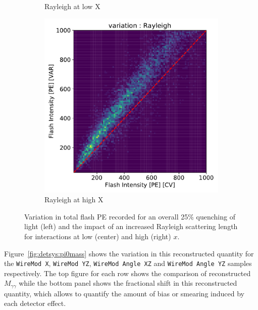 \documentclass[a4paper]{article}
\begin{document}
\begin{figure}[H]
\begin{center}
\begin{subfigure}[b]{0.3\textwidth}
    \caption{\label{fig:detsys:flashpe:RYlow}Rayleigh at low X}
    \end{subfigure}
    \begin{subfigure}[b]{0.3\textwidth}
    \centering
    \includegraphics[width=1.00\textwidth]{detsys/light/flash_pe_corr_02252020_Rayleigh_highX.pdf}
    \caption{\label{fig:detsys:flashpe:RYhigh}Rayleigh at high X}
    \end{subfigure}
\caption{\label{fig:detsys:flashpe}Variation in total flash PE recorded for an overall 25\% quenching of light (left) and the impact of an increased Rayleigh scattering length for interactions at low (center) and high (right) $x$.}
\end{center}
\end{figure}

 Figure~\ref{fig:detsys:pi0mass} shows the variation in this reconstructed quantity for the \texttt{WireMod X}, \texttt{WireMod YZ}, \texttt{WireMod Angle XZ} and \texttt{WireMod Angle YZ} samples respectively. The top figure for each row shows the comparison of reconstructed $M_{\gamma\gamma}$ while the bottom panel shows the fractional shift in this reconstructed quantity, which allows to quantify the amount of bias or smearing induced by each detector effect.
\end{document}

